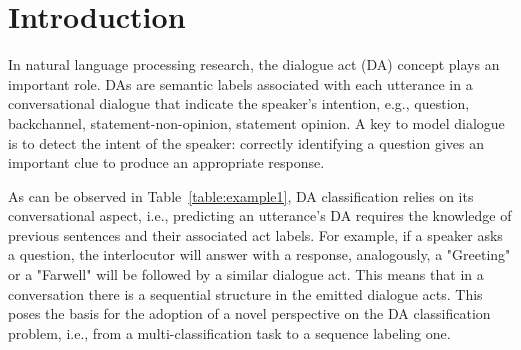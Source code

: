 \documentclass[letterpaper]{article} \usepackage{aaai20}  \usepackage{times}  \usepackage{helvet} \usepackage{courier}  \usepackage[hyphens]{url}  \usepackage{graphicx} \urlstyle{rm} \def\UrlFont{\rm}  \usepackage{graphicx}  \frenchspacing  \setlength{\pdfpagewidth}{8.5in}  \setlength{\pdfpageheight}{11in}
\begin{document}
\section{Introduction}
In natural language processing research, the dialogue act (DA) concept plays an important role. DAs are semantic labels associated with each utterance in a conversational dialogue that indicate the speaker's intention, e.g., question, backchannel, statement-non-opinion, statement opinion. A key to model dialogue is to detect the intent of the speaker: correctly identifying a question gives an important clue to produce an appropriate response.
\begin{table}[htb]
\begin{center}
\end{center}
\caption{Example of conversation from Switchboard Dialogue Act Corpus. A is speaking with B.}
\label{table:example1}
\end{table}
As can be observed in Table~\ref{table:example1}, DA classification relies on its conversational aspect, i.e., predicting an utterance's DA requires the knowledge of previous sentences and their associated act labels. For example, if a speaker asks a question, the interlocutor will answer with a response, analogously, a "Greeting" or a "Farwell" will be followed by a similar dialogue act. This means that in a conversation there is a sequential structure in the emitted dialogue acts. This poses the basis for the adoption of a novel perspective on the DA classification problem, i.e., from a multi-classification task to a sequence labeling one. 
\end{document}
